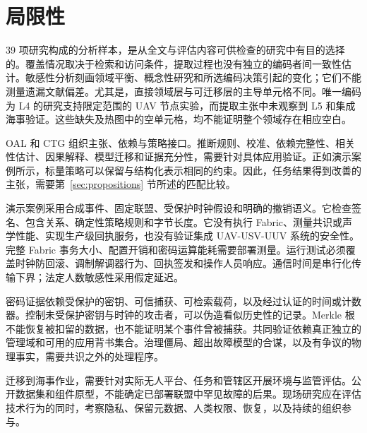 \section{局限性}\label{sec:limitations}

39 项研究构成的分析样本，是从全文与评估内容可供检查的研究中有目的选择的。覆盖情况取决于检索和访问条件，提取过程也没有独立的编码者间一致性估计。敏感性分析刻画领域平衡、概念性研究和所选编码决策引起的变化；它们不能测量遗漏文献偏差。尤其是，直接领域层与可迁移层的主导单元格不同。唯一编码为 L4 的研究支持限定范围的 UAV 节点实验，而提取主张中未观察到 L5 和集成海事验证。这些缺失及热图中的空单元格，均不能证明整个领域存在相应空白。

OAL 和 CTG 组织主张、依赖与策略接口。推断规则、校准、依赖完整性、相关性估计、因果解释、模型迁移和证据充分性，需要针对具体应用验证。正如演示案例所示，标量策略可以保留与结构化表示相同的约束。因此，任务结果得到改善的主张，需要第~\ref{sec:propositions} 节所述的匹配比较。

演示案例采用合成事件、固定联盟、受保护时钟假设和明确的撤销语义。它检查签名、包含关系、确定性策略规则和字节长度。它没有执行 Fabric、测量共识或声学性能、实现生产级回执服务，也没有验证集成 UAV-USV-UUV 系统的安全性。完整 Fabric 事务大小、配置开销和密码运算能耗需要部署测量。运行测试必须覆盖时钟防回滚、调制解调器行为、回执签发和操作人员响应。通信时间是串行化传输下界；法定人数敏感性采用假定延迟。

密码证据依赖受保护的密钥、可信捕获、可检索载荷，以及经过认证的时间或计数器。控制未受保护密钥与时钟的攻击者，可以伪造看似历史性的记录。Merkle 根不能恢复被扣留的数据，也不能证明某个事件曾被捕获。共同验证依赖真正独立的管理域和可用的应用背书集合。治理僵局、超出故障模型的合谋，以及有争议的物理事实，需要共识之外的处理程序。

迁移到海事作业，需要针对实际无人平台、任务和管辖区开展环境与监管评估。公开数据集和组件原型，不能确定已部署联盟中罕见故障的后果。现场研究应在评估技术行为的同时，考察隐私、保留元数据、人类权限、恢复，以及持续的组织参与。
